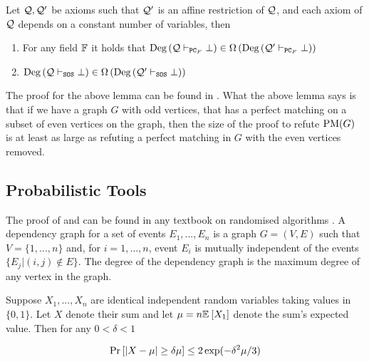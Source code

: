 \documentclass[11pt]{article}
\begin{document}
\begin{lemma}\label{lemma:affine_restriction}
Let $\mathcal{Q}, \mathcal{Q}'$ be axioms such that $\mathcal{Q}'$ is an affine restriction of $\mathcal{Q}$, and each axiom
of $\mathcal{Q}$ depends on a constant number of variables, then
\begin{enumerate}
	\item For any field $\mathbb{F}$ it holds that $\text{Deg}\left(\mathcal{Q} \vdash_{\texttt{PC}_F} \bot\right) \in \Omega\left(\text{Deg}\left(\mathcal{Q}' \vdash_{\texttt{PC}_F} \bot\right)\right)$
	\item $\text{Deg}\left(\mathcal{Q} \vdash_{\texttt{SOS}} \bot\right) \in \Omega\left(\text{Deg}\left(\mathcal{Q}' \vdash_{\texttt{SOS}} \bot\right)\right)$
\end{enumerate}
\end{lemma}

The proof for the above lemma can be found in \citep[Lemma 2.2]{Austrin_2022}.
What the above lemma says is that if we have a graph $G$ with odd vertices, that has a perfect matching on a subset of even vertices on the graph, then the size of the proof to refute $\text{PM}(G)$ is at least as large as refuting a perfect matching in $G$ with the even vertices removed.

\subsection{Probabilistic Tools}

The proof of  and 
can be found in any textbook on randomised algorithms \citep[See Chapter 1, Chapter 7]{mitzenmacher2017probability}.
A dependency graph for a set of events $E_1, . . . , E_n$ is a graph $G=(V, E)$ such that $V = \{1,.. . , n\}$ and,  for $i= 1,\dots, n$, event $E_i$ is mutually independent
of the events $\{E_j | (i, j) \notin E\}$. The degree of the dependency graph is the maximum degree of any vertex in the graph.


\begin{lemma}\label{lemma:mult-chernoff}
Suppose $X_1, ..., X_n$ are identical independent random variables taking values in $\{0, 1\}$. Let $X$ denote their sum and let $\mu = n\mathbb{E}_{}\left[X_1\right]$ denote the sum's expected value. Then for any $0 < \delta < 1$

\[ \Pr\left[|X - \mu| \geq \delta \mu \right] \leq 2\exp(-\delta^2\mu/3)\]

\end{lemma}
\end{document}
